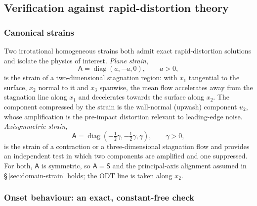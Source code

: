 \documentclass[lineno]{JFM-FLM_Au}
\begin{document}
\subsection{Verification against rapid-distortion theory}\label{sec:verification}

\subsubsection{Canonical strains}

Two irrotational homogeneous strains both admit exact rapid-distortion
solutions and isolate the physics of interest. \emph{Plane strain},
\begin{equation}
  \mathsf{A}=\operatorname{diag}(a,-a,0),\qquad a>0,
  \label{eq:plane-strain}
\end{equation}
is the strain of a two-dimensional stagnation region: with $x_1$ tangential
to the surface, $x_2$ normal to it and $x_3$ spanwise, the mean flow
accelerates away from the stagnation line along $x_1$ and decelerates
towards the surface along $x_2$. The component compressed by the strain is
the wall-normal (upwash) component $u_2$, whose amplification is the
pre-impact distortion relevant to leading-edge noise. \emph{Axisymmetric
strain},
\begin{equation}
  \mathsf{A}=\operatorname{diag}(-\tfrac12\gamma,-\tfrac12\gamma,\gamma),
  \qquad \gamma>0,
  \label{eq:axi-strain}
\end{equation}
is the strain of a contraction or a three-dimensional stagnation flow and
provides an independent test in which two components are amplified and one
suppressed. For both, $\mathsf{A}$ is symmetric, so $\mathsf{A}=\mathsf{S}$
and the principal-axis alignment assumed in \S\,\ref{sec:domain-strain}
holds; the ODT line is taken along $x_2$.

\subsubsection{Onset behaviour: an exact, constant-free check}\label{sec:onset}
\end{document}
